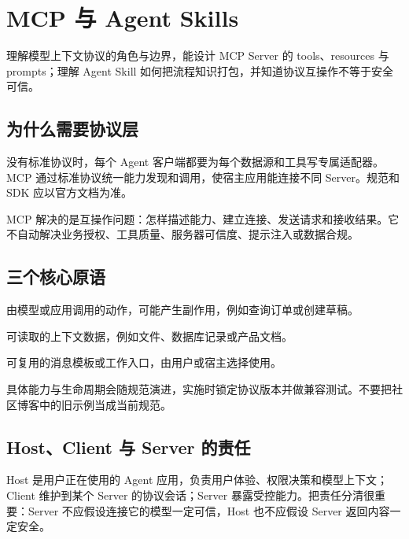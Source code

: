 \chapter{MCP 与 Agent Skills}
\label{chap:mcp-skills}

\begin{takeaway}[学习目标]
理解模型上下文协议的角色与边界，能设计 MCP Server 的 tools、resources 与 prompts；理解 Agent Skill 如何把流程知识打包，并知道协议互操作不等于安全可信。
\end{takeaway}

\section{为什么需要协议层}

没有标准协议时，每个 Agent 客户端都要为每个数据源和工具写专属适配器。MCP 通过标准协议统一能力发现和调用，使宿主应用能连接不同 Server。规范和 SDK 应以官方文档为准\citep{mcp_spec,mcp_python_sdk}。

MCP 解决的是互操作问题：怎样描述能力、建立连接、发送请求和接收结果。它不自动解决业务授权、工具质量、服务器可信度、提示注入或数据合规。

\section{三个核心原语}

\begin{description}[style=nextline,leftmargin=2em]
  \item[Tools] 由模型或应用调用的动作，可能产生副作用，例如查询订单或创建草稿。
  \item[Resources] 可读取的上下文数据，例如文件、数据库记录或产品文档。
  \item[Prompts] 可复用的消息模板或工作入口，由用户或宿主选择使用。
\end{description}

具体能力与生命周期会随规范演进，实施时锁定协议版本并做兼容测试。不要把社区博客中的旧示例当成当前规范。

\section{Host、Client 与 Server 的责任}

Host 是用户正在使用的 Agent 应用，负责用户体验、权限决策和模型上下文；Client 维护到某个 Server 的协议会话；Server 暴露受控能力。把责任分清很重要：Server 不应假设连接它的模型一定可信，Host 也不应假设 Server 返回内容一定安全。

